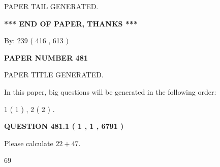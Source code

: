 \documentclass[12pt]{article}
\begin{document}
   
   
   
   
   
 \vspace{0.2in}
 
   
   
\vspace{2.0in} PAPER TAIL GENERATED.
   
   
   
   
\vspace{1.0in} 
{\textbf{\large{ *** END OF PAPER, THANKS *** }}} 
   
   
\hspace{1.0in} By: 
 239 ( 416 ,  613 )
   
   
   
   
\newpage 
\setcounter{page}{ 
   481001 } 
   
   
   
   
 {\textbf{ \Large{ PAPER NUMBER  481  }}}
   
   
\vspace{0.2in}
   
   
   
   
   
   
   
   
 \vspace{0.2in}
 
 
 
 
   
   
 PAPER TITLE GENERATED.
   
   
   
\vspace{0.2in}
   
In this paper, big questions will be generated in the following order: 
   
   
   1 ( 1 )
 ,
   2 ( 2 )
 .
  
\vspace{0.2in}
  
{\textbf{\Large{QUESTION
481.1 
 ( 1 , 1 , 6791 )
}}}
  
  
 
Please calculate $ %
22 +  %
47 $.
 
 
 
\noindent{}
 
 

69
 
 
\noindent{}
 
\end{document}
